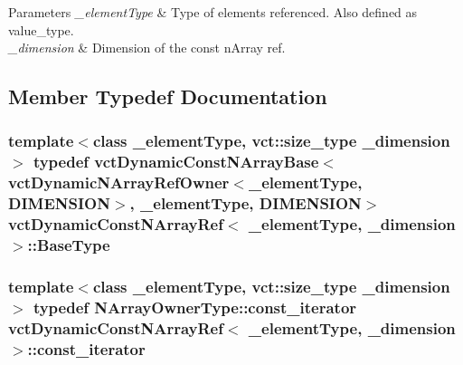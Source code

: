 \begin{DoxyParams}{Parameters}
{\em \-\_\-element\-Type} & Type of elements referenced. Also defined as {\ttfamily value\-\_\-type}.\\
\hline
{\em \-\_\-dimension} & Dimension of the const n\-Array ref. \\
\hline
\end{DoxyParams}


\subsection{Member Typedef Documentation}
\hypertarget{classvct_dynamic_const_n_array_ref_a8f6858abb088ed618d4cb4cea8309199}{
\subsubsection[{Base\-Type}]{\setlength{\rightskip}{0pt plus 5cm}template$<$class \-\_\-element\-Type, vct\-::size\-\_\-type \-\_\-dimension$>$ typedef {\bf vct\-Dynamic\-Const\-N\-Array\-Base}$<${\bf vct\-Dynamic\-N\-Array\-Ref\-Owner}$<$\-\_\-element\-Type, {\bf D\-I\-M\-E\-N\-S\-I\-O\-N}$>$, \-\_\-element\-Type, {\bf D\-I\-M\-E\-N\-S\-I\-O\-N}$>$ {\bf vct\-Dynamic\-Const\-N\-Array\-Ref}$<$ \-\_\-element\-Type, \-\_\-dimension $>$\-::{\bf Base\-Type}}}\label{classvct_dynamic_const_n_array_ref_a8f6858abb088ed618d4cb4cea8309199}
\hypertarget{classvct_dynamic_const_n_array_ref_a9787d4311b3672d3f5ef00f485441a39}{
\subsubsection[{const\-\_\-iterator}]{\setlength{\rightskip}{0pt plus 5cm}template$<$class \-\_\-element\-Type, vct\-::size\-\_\-type \-\_\-dimension$>$ typedef {\bf N\-Array\-Owner\-Type\-::const\-\_\-iterator} {\bf vct\-Dynamic\-Const\-N\-Array\-Ref}$<$ \-\_\-element\-Type, \-\_\-dimension $>$\-::{\bf const\-\_\-iterator}}}\label{classvct_dynamic_const_n_array_ref_a9787d4311b3672d3f5ef00f485441a39}

